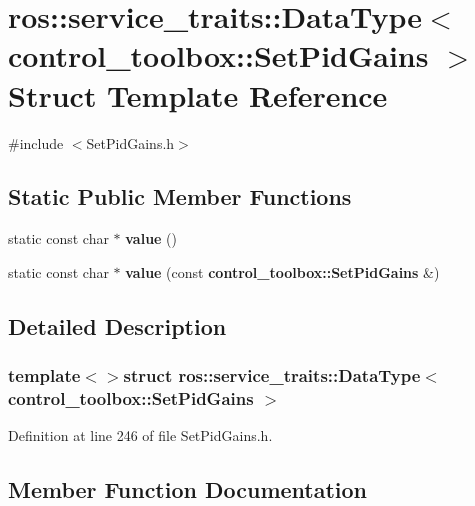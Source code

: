\section{ros\-:\-:service\-\_\-traits\-:\-:\-Data\-Type$<$ control\-\_\-toolbox\-:\-:\-Set\-Pid\-Gains $>$ \-Struct \-Template \-Reference}
\label{structros_1_1service__traits_1_1DataType_3_01control__toolbox_1_1SetPidGains_01_4}


{\ttfamily \#include $<$\-Set\-Pid\-Gains.\-h$>$}

\subsection*{\-Static \-Public \-Member \-Functions}
\begin{DoxyCompactItemize}
\item 
static const char $\ast$ {\bf value} ()
\item 
static const char $\ast$ {\bf value} (const {\bf control\-\_\-toolbox\-::\-Set\-Pid\-Gains} \&)
\end{DoxyCompactItemize}


\subsection{\-Detailed \-Description}
\subsubsection*{template$<$$>$struct ros\-::service\-\_\-traits\-::\-Data\-Type$<$ control\-\_\-toolbox\-::\-Set\-Pid\-Gains $>$}



\-Definition at line 246 of file \-Set\-Pid\-Gains.\-h.



\subsection{\-Member \-Function \-Documentation}
